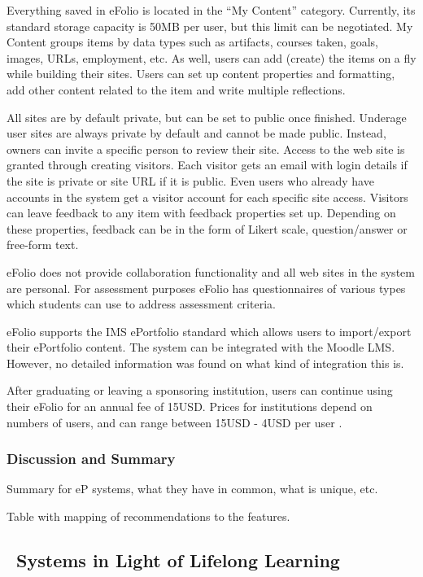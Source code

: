 Everything saved in eFolio is located in the ``My Content'' category. Currently,
its standard storage capacity is 50MB per user, but this limit can be
negotiated. My Content groups items by data types such as artifacts, courses
taken, goals, images, URLs, employment, etc. As well, users can add (create) the
items on a fly while building their sites. Users can set up content properties
and formatting, add other content related to the item and write multiple
reflections.

All sites are by default private, but can be set to public once finished.
Underage user sites are always private by default and cannot be made public.
Instead, owners can invite a specific person to review their site. Access to the
web site is granted through creating visitors. Each visitor gets an email with
login details if the site is private or site URL if it is public. Even users who
already have accounts in the system get a visitor account for each specific site
access. Visitors can leave feedback to any item with feedback properties set up.
Depending on these properties, feedback can be in the form of Likert scale,
question/answer or free-form text.

eFolio does not provide collaboration functionality and all web sites in the
system are personal. For assessment purposes eFolio has questionnaires of
various types which students can use to address assessment criteria.

eFolio supports the IMS ePortfolio standard which allows users to import/export
their ePortfolio content. The system can be integrated with the Moodle LMS.
However, no detailed information was found on what kind of integration this is.

After graduating or leaving a sponsoring institution, users can continue
using their eFolio for an annual fee of 15USD. Prices for institutions depend
on numbers of users, and can range between 15USD - 4USD per user
\citep{AAEEBL2011}.

\subsubsection{Discussion and Summary}
Summary for eP systems, what they have in common, what is unique, etc.

Table with mapping of recommendations to the features.

\subsection{\ep~Systems in Light of Lifelong Learning}


